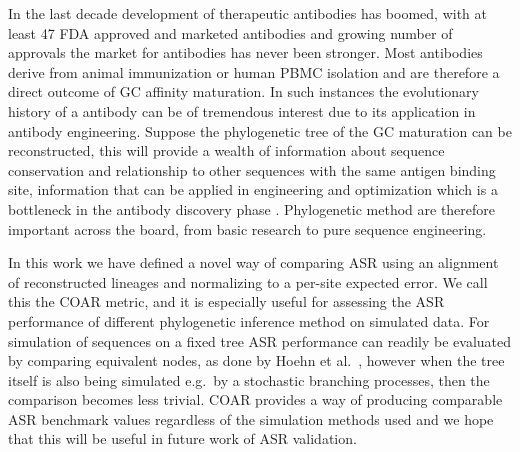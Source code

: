 In the last decade development of therapeutic antibodies has boomed, with at least 47 FDA approved and marketed antibodies and growing number of approvals \cite{ecker2015therapeutic} the market for antibodies has never been stronger.
Most antibodies derive from animal immunization or human PBMC isolation \cite{reichert2012marketed} and are therefore a direct outcome of GC affinity maturation.
In such instances the evolutionary history of a antibody can be of tremendous interest due to its application in antibody engineering.
Suppose the phylogenetic tree of the GC maturation can be reconstructed, this will provide a wealth of information about sequence conservation and relationship to other sequences with the same antigen binding site, information that can be applied in engineering and optimization which is a bottleneck in the antibody discovery phase \cite{dubel2014handbook}.
Phylogenetic method are therefore important across the board, from basic research to pure sequence engineering.

In this work we have defined a novel way of comparing ASR using an alignment of reconstructed lineages and normalizing to a per-site expected error.
We call this the COAR metric, and it is especially useful for assessing the ASR performance of different phylogenetic inference method on simulated data.
For simulation of sequences on a fixed tree ASR performance can readily be evaluated by comparing equivalent nodes, as done by Hoehn et al.\ \cite{Hoehn2016-wg}, however when the tree itself is also being simulated e.g.\ by a stochastic branching processes, then the comparison becomes less trivial.
COAR provides a way of producing comparable ASR benchmark values regardless of the simulation methods used and we hope that this will be useful in future work of ASR validation.

